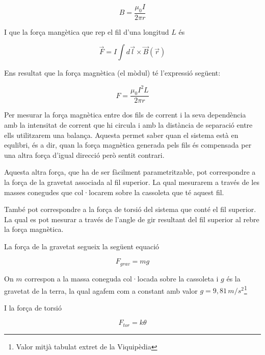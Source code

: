 \documentclass[11pt]{article}
\numberwithin{equation}{section}
\numberwithin{figure}{section}
\numberwithin{table}{section}
\begin{document}
\begin{equation}\label{eq_PR2: PR2_camp_fil_infinit}
    B = \frac{\mu_0I}{2\pi r}
\end{equation}

I que la força mangètica que rep el fil d'una longitud $L$ és

\begin{equation}\label{eq: PR2_Fmagn_en_funcio_B}
    \vec{F} = I\int d\vec{l}\times\vec{B}(\vec{r})
\end{equation}

Ens resultat que la força magnètica (el mòdul) té l'expressió següent:

\begin{equation}\label{eq: PR2_Fm_entre_fils}
    F = \frac{\mu_0I^2L}{2\pi r}
\end{equation}

Per mesurar la força magnètica entre dos fils de corrent i la seva dependència amb la intensitat de corrent que hi circula i amb la distància de separació entre ells utilitzarem una balança. Aquesta permet saber quan el sistema està en equlibri, és a dir, quan la força magnètica generada pels fils és compensada per una altra força d'igual direcció però sentit contrari. 

Aquesta altra força, que ha de ser fàcilment parametritzable, pot correspondre a la força de la gravetat associada al fil superior. La qual mesurarem a través de les masses conegudes que col·locarem sobre la cassoleta que té aquest fil.

També pot correspondre a la força de torsió del sistema que conté el fil superior. La qual es pot mesurar a través de l'angle de gir resultant del fil superior al rebre la força magnètica.
 
La força de la gravetat segueix la següent equació

\begin{equation}\label{eq: PR2_Fgrav}
    F_{grav} = mg
\end{equation}

On $m$ correspon a la massa coneguda col·locada sobre la cassoleta i $g$ és la gravetat de la terra, la qual agafem com a constant amb valor $g = 9,81 \, m/s^2$\footnote{Valor mitjà tabulat extret de la Viquipèdia}

I la força de torsió

\begin{equation}\label{PR2_Ftorsio}
    F_{tor} = k\theta
\end{equation}
\end{document}
